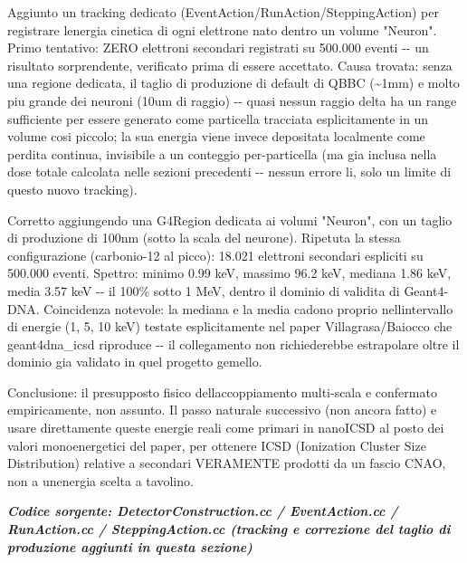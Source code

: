 \documentclass[
  italian,
]{article}
\begin{document}
Aggiunto un tracking dedicato (EventAction/RunAction/SteppingAction) per registrare l\textquotesingle energia cinetica di ogni elettrone nato dentro un volume "Neuron". Primo tentativo: ZERO elettroni secondari registrati su 500.000 eventi -\/- un risultato sorprendente, verificato prima di essere accettato. Causa trovata: senza una regione dedicata, il taglio di produzione di default di QBBC (\textasciitilde1mm) e\textquotesingle{} molto piu\textquotesingle{} grande dei neuroni (10um di raggio) -\/- quasi nessun raggio delta ha un range sufficiente per essere generato come particella tracciata esplicitamente in un volume cosi\textquotesingle{} piccolo; la sua energia viene invece depositata localmente come perdita continua, invisibile a un conteggio per-particella (ma gia\textquotesingle{} inclusa nella dose totale calcolata nelle sezioni precedenti -\/- nessun errore li\textquotesingle, solo un limite di questo nuovo tracking).

Corretto aggiungendo una G4Region dedicata ai volumi "Neuron", con un taglio di produzione di 100nm (sotto la scala del neurone). Ripetuta la stessa configurazione (carbonio-12 al picco): 18.021 elettroni secondari espliciti su 500.000 eventi. Spettro: minimo 0.99 keV, massimo 96.2 keV, mediana 1.86 keV, media 3.57 keV -\/- il 100\% sotto 1 MeV, dentro il dominio di validita\textquotesingle{} di Geant4-DNA. Coincidenza notevole: la mediana e la media cadono proprio nell\textquotesingle intervallo di energie (1, 5, 10 keV) testate esplicitamente nel paper Villagrasa/Baiocco che geant4dna\_\allowbreak{}icsd riproduce -\/- il collegamento non richiederebbe estrapolare oltre il dominio gia\textquotesingle{} validato in quel progetto gemello.

Conclusione: il presupposto fisico dell\textquotesingle accoppiamento multi-scala e\textquotesingle{} confermato empiricamente, non assunto. Il passo naturale successivo (non ancora fatto) e\textquotesingle{} usare direttamente queste energie reali come primari in nanoICSD al posto dei valori monoenergetici del paper, per ottenere ICSD (Ionization Cluster Size Distribution) relative a secondari VERAMENTE prodotti da un fascio CNAO, non a un\textquotesingle energia scelta a tavolino.

\textit{\textbf{Codice sorgente: DetectorConstruction.cc / EventAction.cc / RunAction.cc / SteppingAction.cc (tracking e correzione del taglio di produzione aggiunti in questa sezione)}}





\end{document}
